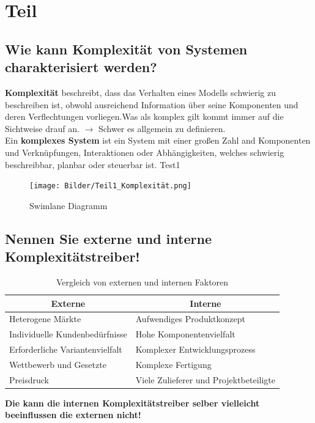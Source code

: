 \section{Teil}

\subsection{Wie kann Komplexität von Systemen charakterisiert werden?}
\textbf{Komplexität} beschreibt, dass das Verhalten eines Modells schwierig zu beschreiben ist, obwohl ausreichend Information über seine Komponenten
 und deren Verflechtungen vorliegen.Was als komplex gilt kommt immer auf die Sichtweise drauf an. $\rightarrow$ Schwer es allgemein zu definieren.
\\

Ein \textbf{komplexes System} ist ein System mit einer großen Zahl and Komponenten und Verknüpfungen, Interaktionen oder Abhängigkeiten, 
welches schwierig beschreibbar, planbar oder steuerbar ist. Test1

\begin{figure}[H]
	\centering
	\texttt{[image: Bilder/Teil1\_Komplexität.png]}
	\caption{Swimlane Diagramm}
\end{figure}

\subsection{Nennen Sie externe und interne Komplexitätstreiber!}
	

\begin{table}[h!]
	\centering
	\begin{tabular}{|p{7cm}|p{7cm}|}
		\hline
		\multicolumn{1}{|c|}{\textbf{Externe}} & \multicolumn{1}{c|}{\textbf{Interne}} \\ \hline
		Heterogene Märkte & Aufwendiges Produktkonzept \\ \hline
		Individuelle Kundenbedürfnisse & Hohe Komponentenvielfalt \\ \hline
		Erforderliche Variantenvielfalt & Komplexer Entwicklungsprozess \\ \hline
		Wettbewerb und Gesetzte & Komplexe Fertigung \\ \hline
		Preisdruck & Viele Zulieferer und Projektbeteiligte \\ \hline
	\end{tabular}
	\caption{Vergleich von externen und internen Faktoren}
	\label{tab:extern-intern}
\end{table}
\textbf{Die kann die internen Komplexitätstreiber selber vielleicht beeinflussen die externen nicht!}

